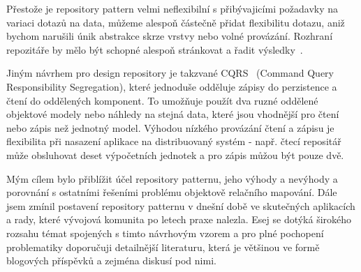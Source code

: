 \documentclass[10pt]{article}
\begin{document}
Přestože je repository pattern velmi neflexibilní s přibývajicími požadavky na
variaci dotazů na data, můžeme alespoň částečně přidat flexibilitu dotazu, aniž
bychom narušili únik abstrakce skrze vrstvy nebo volné provázání. Rozhraní
repozitáře by mělo být schopné alespoň stránkovat a řadit
výsledky~\cite{repository_done_right}\cite{so_jgauffin}.

Jiným návrhem pro design repository je takzvané CQRS~\cite{CQRS} (Command Query
Responsibility Segregation), které jednoduše odděluje zápisy do perzistence a
čtení do oddělených komponent. To umožňuje použít dva ruzné oddělené objektové
modely nebo náhledy na stejná data, které jsou vhodnější pro čtení nebo zápis
než jednotný model. Výhodou nízkého provázání čtení a zápisu je flexibilita při
nasazení aplikace na distribuovaný systém - např. čtecí repositář může
obsluhovat deset výpočetních jednotek a pro zápis můžou být pouze dvě.

Mým cílem bylo přiblížit účel repository patternu, jeho výhody a nevýhody a
porovnání s ostatními řešeními problému objektově relačního mapování. Dále jsem
zmínil postavení repository patternu v dnešní době ve skutečných aplikacích a
rady, které vývojová komunita po letech praxe nalezla. Esej se dotýká širokého
rozsahu témat spojených s timto návrhovým vzorem a pro plné pochopení
problematiky doporučuji detailnější literaturu, která je většinou ve formě
blogových příspěvků a zejména diskusí pod nimi.




\end{document}
